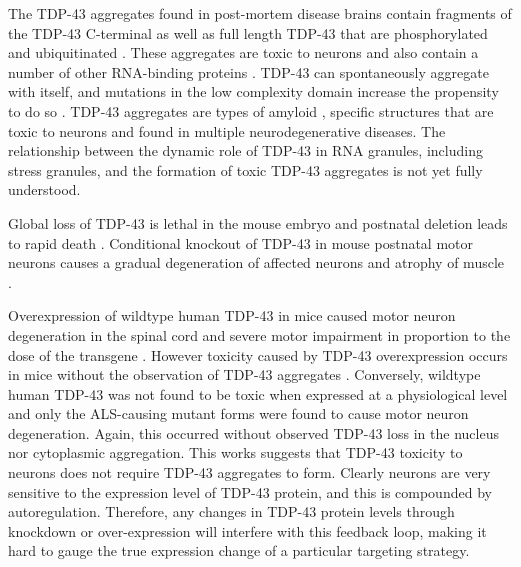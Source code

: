 The TDP-43 aggregates found in post-mortem disease brains contain fragments of the TDP-43 C-terminal as well as full length TDP-43 that are phosphorylated and ubiquitinated \citep{Neumann2006,Arai2006, Bosque2013, Hasegawa2008}.
These aggregates are toxic to neurons  \citep{Zhang2009} and also contain a number of other RNA-binding proteins \citep{Dammer2012}.
TDP-43 can spontaneously aggregate with itself, and mutations in the low complexity domain increase the propensity to do so \citep{Johnson2009}.
TDP-43 aggregates are types of amyloid \citep{Fang2014}, specific structures that are toxic to neurons and found in multiple neurodegenerative diseases.
The relationship between the dynamic role of TDP-43 in RNA granules, including stress granules, and the formation of toxic TDP-43 aggregates is not yet fully understood.

Global loss of TDP-43 is lethal in the mouse embryo \citep{Kraemer2010} and postnatal deletion leads to rapid death \citep{Chiang2010}. 
Conditional knockout of TDP-43 in mouse postnatal motor neurons causes a gradual degeneration of affected neurons and atrophy of muscle \citep{Iguchi2013}. 

Overexpression of wildtype human TDP-43 in mice caused motor neuron degeneration in the spinal cord and severe motor impairment in proportion to the dose of the transgene \citep{Wils2010, Shan2010}.
However toxicity caused by TDP-43 overexpression occurs in mice without the observation of TDP-43 aggregates \citep{Wegorzewska2009, Barmada2010}.
Conversely, wildtype human TDP-43 was not found to be toxic when expressed at a physiological level \citep{Arnold2013} and only the ALS-causing mutant forms were found to cause motor neuron degeneration. 
Again, this occurred without observed TDP-43 loss in the nucleus nor cytoplasmic aggregation. 
This works suggests that TDP-43 toxicity to neurons does not require TDP-43 aggregates to form.
Clearly neurons are very sensitive to the expression level of TDP-43 protein, and this is compounded by autoregulation. 
Therefore, any changes in TDP-43 protein levels through knockdown or over-expression will interfere with this feedback loop, making it hard to gauge the true expression change of a particular targeting strategy. 







